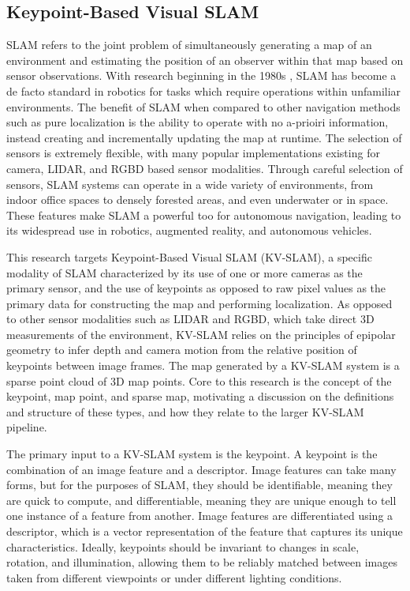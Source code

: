 \subsection{Keypoint-Based Visual SLAM}

SLAM refers to the joint problem of simultaneously generating a map of an environment and estimating the position of an observer within that map based on sensor observations. With research beginning in the 1980s \cite{smithEstimatingUncertainSpatial1988}, SLAM has become a de facto standard in robotics for tasks which require operations within unfamiliar environments. The benefit of SLAM when compared to other navigation methods such as pure localization is the ability to operate with no a-prioiri information, instead creating and incrementally updating the map at runtime. The selection of sensors is extremely flexible, with many popular implementations existing for camera, LIDAR, and RGBD based sensor modalities. Through careful selection of sensors, SLAM systems can operate in a wide variety of environments, from indoor office spaces to densely forested areas, and even underwater or in space.  These features make SLAM a powerful too for autonomous navigation, leading to its widespread use in robotics, augmented reality, and autonomous vehicles.

This research targets Keypoint-Based Visual SLAM (KV-SLAM), a specific modality of SLAM characterized by its use of one or more cameras as the primary sensor, and the use of keypoints as opposed to raw pixel values as the primary data for constructing the map and performing localization. As opposed to other sensor modalities such as LIDAR and RGBD, which take direct 3D measurements of the environment, KV-SLAM relies on the principles of epipolar geometry to infer depth and camera motion from the relative position of keypoints between image frames. The map generated by a KV-SLAM system is a sparse point cloud of 3D map points. Core to this research is the concept of the keypoint, map point, and sparse map, motivating a discussion on the definitions and structure of these types, and how they relate to the larger KV-SLAM pipeline.

The primary input to a KV-SLAM system is the keypoint. A keypoint is the combination of an image feature and a descriptor. Image features can take many forms, but for the purposes of SLAM, they should be identifiable, meaning they are quick to compute, and differentiable, meaning they are unique enough to tell one instance of a feature from another. Image features are differentiated using a descriptor, which is a vector representation of the feature that captures its unique characteristics. Ideally, keypoints should be invariant to changes in scale, rotation, and illumination, allowing them to be reliably matched between images taken from different viewpoints or under different lighting conditions.

